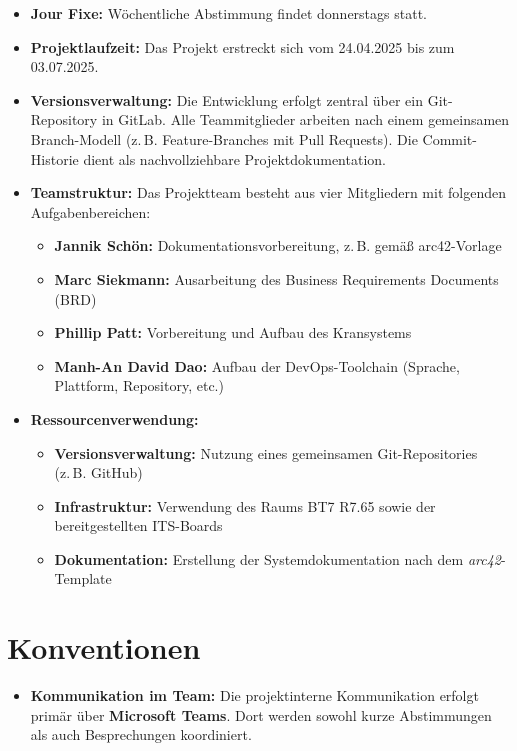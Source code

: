 \begin{itemize}
    \item \textbf{Jour Fixe:}  
    Wöchentliche Abstimmung findet donnerstags statt.

    \item \textbf{Projektlaufzeit:}  
    Das Projekt erstreckt sich vom 24.04.2025 bis zum 03.07.2025.
    \item \textbf{Versionsverwaltung:}  
    Die Entwicklung erfolgt zentral über ein Git-Repository in GitLab. Alle Teammitglieder arbeiten nach einem gemeinsamen Branch-Modell (z. B. Feature-Branches mit Pull Requests). Die Commit-Historie dient als nachvollziehbare Projektdokumentation.

    \item \textbf{Teamstruktur:}  
    Das Projektteam besteht aus vier Mitgliedern mit folgenden Aufgabenbereichen:
    \begin{itemize}
        \item \textbf{Jannik Schön:} Dokumentationsvorbereitung, z. B. gemäß arc42-Vorlage
        \item \textbf{Marc Siekmann:} Ausarbeitung des Business Requirements Documents (BRD)
        \item \textbf{Phillip Patt:} Vorbereitung und Aufbau des Kransystems
        \item \textbf{Manh-An David Dao:} Aufbau der DevOps-Toolchain (Sprache, Plattform, Repository, etc.)
    \end{itemize}

    \item \textbf{Ressourcenverwendung:}
    \begin{itemize}
        \item \textbf{Versionsverwaltung:} Nutzung eines gemeinsamen Git-Repositories (z. B. GitHub)
        \item \textbf{Infrastruktur:} Verwendung des Raums BT7 R7.65 sowie der bereitgestellten ITS-Boards
        \item \textbf{Dokumentation:} Erstellung der Systemdokumentation nach dem \textit{arc42}-Template
    \end{itemize}
\end{itemize}

\section{Konventionen}
\begin{itemize}
     \item \textbf{Kommunikation im Team:}  
    Die projektinterne Kommunikation erfolgt primär über \textbf{Microsoft Teams}. Dort werden sowohl kurze Abstimmungen als auch Besprechungen koordiniert.

\end{itemize}